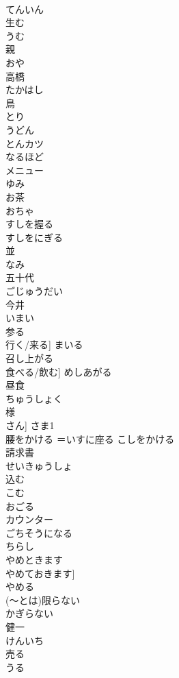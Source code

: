 \documentclass[8pt]{extreport}
\begin{document}
\begin{CJK}{UTF8}{min}
\\	てんいん
\\	生む	
\\	うむ
\\	親	
\\	おや
\\	高橋	
\\	たかはし
\\	鳥	
\\	とり
\\	うどん	
\\	とんカツ	
\\	なるほど	
\\	メニュー	
\\	ゆみ	
\\	お茶	
\\	おちゃ
\\	すしを握る	
\\	すしをにぎる
\\	並	
\\	なみ
\\	五十代	
\\	ごじゅうだい
\\	今井	
\\	いまい
\\	参る	
\\	行く/来る]	まいる
\\	召し上がる	
\\	食べる/飲む]	めしあがる
\\	昼食	
\\	ちゅうしょく
\\	様	
\\	さん]	さま1
\\	腰をかける	＝いすに座る	こしをかける
\\	請求書	
\\	せいきゅうしょ
\\	込む	
\\	こむ
\\	おごる	
\\	カウンター	
\\	ごちそうになる	
\\	ちらし	
\\	やめときます	
\\	やめておきます]	
\\	やめる	
\\	(～とは)限らない	
\\	かぎらない
\\	健一	
\\	けんいち
\\	売る	
\\	うる

\end{CJK}
\end{document}
